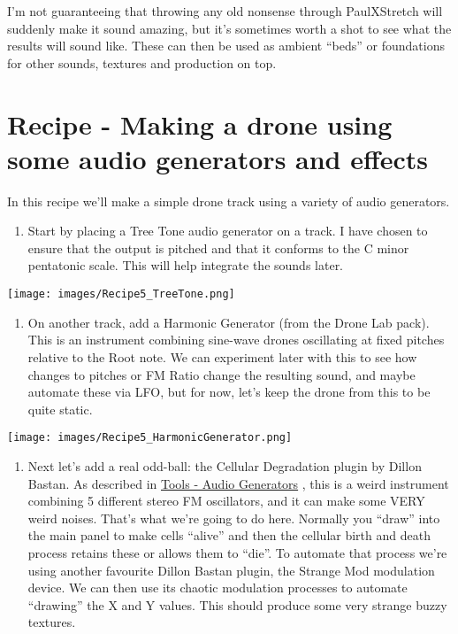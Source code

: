 \documentclass[
  12pt,
  letterpaper,
  oneside,
  open=any]{scrbook}
\providecommand{\tightlist}{%
  \setlength{\itemsep}{0pt}\setlength{\parskip}{0pt}}\usepackage{longtable,booktabs,array}
\begin{document}
I'm not guaranteeing that throwing any old nonsense through PaulXStretch
will suddenly make it sound amazing, but it's sometimes worth a shot to
see what the results will sound like. These can then be used as ambient
``beds'' or foundations for other sounds, textures and production on
top.


\chapter{Recipe - Making a drone using some audio generators and
effects}\label{Chapter-017-Recipe-Audio_generators_drone}

In this recipe we'll make a simple drone track using a variety of audio
generators.

\begin{enumerate}
\def\labelenumi{\arabic{enumi}.}
\tightlist
\item
  Start by placing a Tree Tone audio generator on a track. I have chosen
  to ensure that the output is pitched and that it conforms to the C
  minor pentatonic scale. This will help integrate the sounds later.
\end{enumerate}

\texttt{[image: images/Recipe5\_TreeTone.png]}

\begin{enumerate}
\def\labelenumi{\arabic{enumi}.}
\setcounter{enumi}{1}
\tightlist
\item
  On another track, add a Harmonic Generator (from the Drone Lab pack).
  This is an instrument combining sine-wave drones oscillating at fixed
  pitches relative to the Root note. We can experiment later with this
  to see how changes to pitches or FM Ratio change the resulting sound,
  and maybe automate these via LFO, but for now, let's keep the drone
  from this to be quite static.
\end{enumerate}

\texttt{[image: images/Recipe5\_HarmonicGenerator.png]}

\begin{enumerate}
\def\labelenumi{\arabic{enumi}.}
\setcounter{enumi}{2}
\tightlist
\item
  Next let's add a real odd-ball: the Cellular Degradation plugin by
  Dillon Bastan. As described in
  \hyperref[Chapter-014-Tools-Audio_Generators]{Tools - Audio
  Generators} , this is a weird instrument combining 5 different stereo
  FM oscillators, and it can make some VERY weird noises. That's what
  we're going to do here. Normally you ``draw'' into the main panel to
  make cells ``alive'' and then the cellular birth and death process
  retains these or allows them to ``die''. To automate that process
  we're using another favourite Dillon Bastan plugin, the Strange Mod
  modulation device. We can then use its chaotic modulation processes to
  automate ``drawing'' the X and Y values. This should produce some very
  strange buzzy textures.
\end{enumerate}
\end{document}
